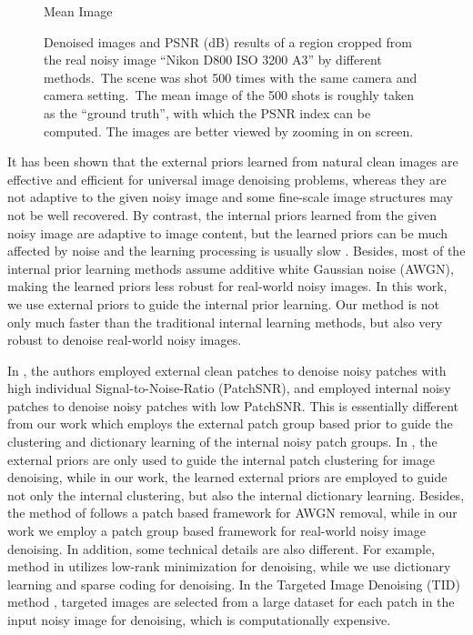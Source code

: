 \begin{figure}
{\begin{minipage}[t]{0.19\textwidth}
{\footnotesize Mean Image}
\end{minipage}
}\vspace{-3mm}
\caption{Denoised images and PSNR (dB) results of a region cropped from the real noisy image ``Nikon D800 ISO 3200 A3'' \cite{crosschannel2016} by different methods.\ The scene was shot 500 times with the same camera and camera setting.\ The mean image of the 500 shots is roughly taken as the ``ground truth'', with which the PSNR index can be computed. The images are better viewed by zooming in on screen.}
    \label{fig3-1}
\end{figure}

It has been shown \cite{foe,epll,pgpd} that the external priors learned from natural clean images are effective and efficient for universal image denoising problems, whereas they are not adaptive to the given noisy image and some fine-scale image structures may not be well recovered. By contrast, the internal priors learned from the given noisy image are adaptive to image content, but the learned priors can be much affected by noise and the learning processing is usually slow \cite{blsgsm,zhou2012nonparametric,ksvd,lssc,ncsr}. Besides, most of the internal prior learning methods \cite{blsgsm,zhou2012nonparametric,ksvd,lssc,ncsr} assume additive white Gaussian noise (AWGN), making the learned priors less robust for real-world noisy images. In this work, we use external priors to guide the internal prior learning. Our method is not only much faster than the traditional internal learning methods, but also very robust to denoise real-world noisy images.

In \cite{combexin}, the authors employed external clean patches to denoise noisy patches with high individual Signal-to-Noise-Ratio (PatchSNR), and employed internal noisy patches to denoise noisy patches with low PatchSNR. This is essentially different from our work which employs the external patch group based prior to guide the clustering and dictionary learning of the internal noisy patch groups. In \cite{external}, the external priors are only used to guide the internal patch clustering for image denoising, while in our work, the learned external priors are employed to guide not only the internal clustering, but also the internal dictionary learning. Besides, the method of \cite{external} follows a patch based framework for AWGN removal, while in our work we employ a patch group based framework for real-world noisy image denoising. In addition, some technical details are also different. For example, method in \cite{external} utilizes low-rank minimization for denoising, while we use dictionary learning and sparse coding for denoising. In the Targeted Image Denoising (TID) method \cite{tid}, targeted images are selected from a large dataset for each patch in the input noisy image for denoising, which is computationally expensive.


